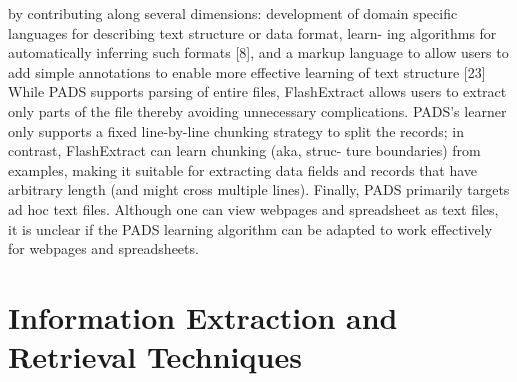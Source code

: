 \documentclass[\myrootdir/main.tex]{subfiles}
\begin{document}
{by contributing along several dimensions: development of domain specific languages for describing text structure or data format, learn- ing algorithms for automatically inferring such formats [8], and a markup language to allow users to add simple annotations to enable more effective learning of text structure [23] While PADS supports parsing of entire files, FlashExtract allows users to extract only parts of the file thereby avoiding unnecessary complications. PADS’s learner only supports a fixed line-by-line chunking strategy to split the records; in contrast, FlashExtract can learn chunking (aka, struc- ture boundaries) from examples, making it suitable for extracting data fields and records that have arbitrary length (and might cross multiple lines). Finally, PADS primarily targets ad hoc text files. Although one can view webpages and spreadsheet as text files, it is unclear if the PADS learning algorithm can be adapted to work effectively for webpages and spreadsheets.
}


\section{Information Extraction and Retrieval Techniques}



\end{document}
